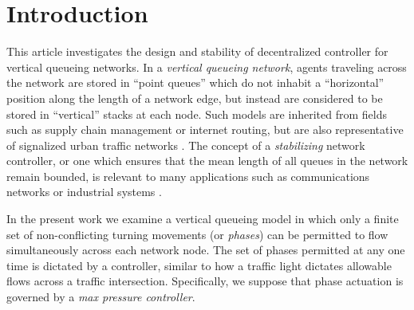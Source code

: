 \section{Introduction}

This article investigates the design and stability of decentralized controller for vertical queueing networks. In a \emph{vertical queueing network}, agents traveling across the network are stored in ``point queues'' which do not inhabit a ``horizontal'' position along the length of a network edge, but instead are considered to be stored in ``vertical'' stacks at each node. Such models are inherited from fields such as supply chain management or internet routing, but are also representative of signalized urban traffic networks \cite{Aboudolas2009}\cite{vandenBerg2003}\cite{Zhang2013}.  The concept of a \emph{stabilizing} network controller, or one which ensures that the mean length of all queues in the network remain bounded, is relevant to many applications such as communications networks \cite{Giaccone2005}\cite{Neely2005}\cite{Pajic2013} or industrial systems \cite{Dai2005}\cite{Egerstedt2002}\cite{Brockett1995}\cite{Ishii2001}.

In the present work we examine a vertical queueing model in which only a finite set of non-conflicting turning movements (or \emph{phases}) can be permitted to flow simultaneously across each network node. The set of phases permitted at any one time is dictated by a controller, similar to how a traffic light dictates allowable flows across a traffic intersection. Specifically, we suppose that phase actuation is governed by a \emph{max pressure controller}. 

